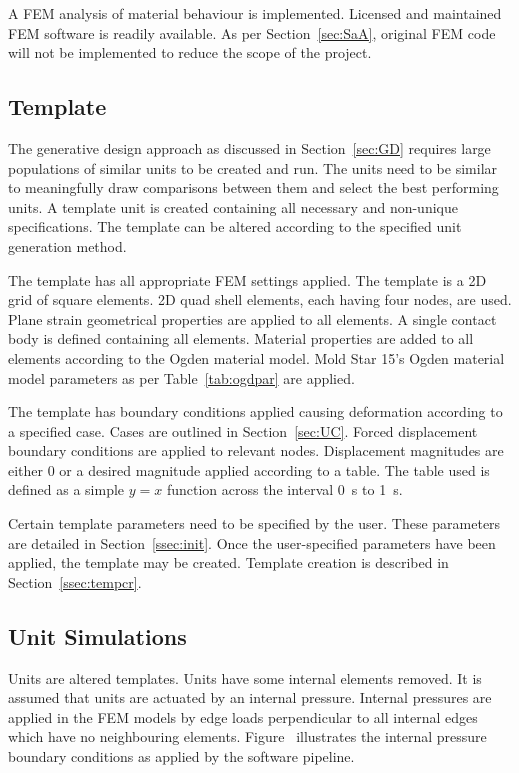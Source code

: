 A FEM analysis of material behaviour is implemented. Licensed and maintained FEM software is readily available. As per Section~\ref{sec:SaA}, original FEM code will not be implemented to reduce the scope of the project.

\subsection{Template}

The generative design approach as discussed in Section~\ref{sec:GD} requires large populations of similar units to be created and run. The units need to be similar to meaningfully draw comparisons between them and select the best performing units. A template unit is created containing all necessary and non-unique specifications. The template can be altered according to the specified unit generation method.

The template has all appropriate FEM settings applied. The template is a 2D grid of square elements. 2D quad shell elements, each having four nodes, are used. Plane strain geometrical properties are applied to all elements. A single contact body is defined containing all elements. Material properties are added to all elements according to the Ogden material model. Mold Star 15's Ogden material model parameters as per Table~\ref{tab:ogdpar} are applied.

The template has boundary conditions applied causing deformation according to a specified case. Cases are outlined in Section~\ref{sec:UC}. Forced displacement boundary conditions are applied to relevant nodes. Displacement magnitudes are either 0 or a desired magnitude applied according to a table. The table used is defined as a simple $y=x$ function across the interval \SI{0}{\second} to \SI{1}{\second}.

Certain template parameters need to be specified by the user. These parameters are detailed in Section~\ref{ssec:init}. Once the user-specified parameters have been applied, the template may be created. Template creation is described in Section~\ref{ssec:tempcr}.

\subsection{Unit Simulations}

Units are altered templates. Units have some internal elements removed. It is assumed that units are actuated by an internal pressure. Internal pressures are applied in the FEM models by edge loads perpendicular to all internal edges which have no neighbouring elements. Figure~ illustrates the internal pressure boundary conditions as applied by the software pipeline.


